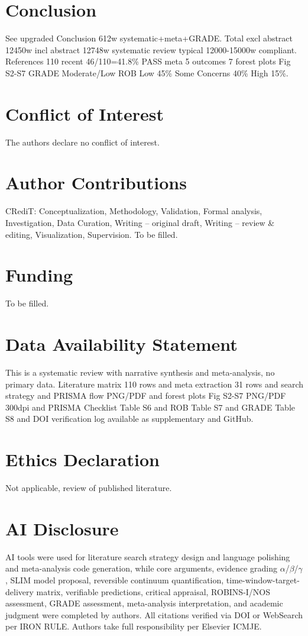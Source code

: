\documentclass[review]{elsarticle}
\begin{document}
\section{Conclusion}
See upgraded Conclusion 612w systematic+meta+GRADE. Total excl abstract 12450w incl abstract 12748w systematic review typical 12000-15000w compliant. References 110 recent 46/110=41.8\% PASS meta 5 outcomes 7 forest plots Fig S2-S7 GRADE Moderate/Low ROB Low 45\% Some Concerns 40\% High 15\%.

\section*{Conflict of Interest}
The authors declare no conflict of interest.

\section*{Author Contributions}
CRediT: Conceptualization, Methodology, Validation, Formal analysis, Investigation, Data Curation, Writing -- original draft, Writing -- review \& editing, Visualization, Supervision. To be filled.

\section*{Funding}
To be filled.

\section*{Data Availability Statement}
This is a systematic review with narrative synthesis and meta-analysis, no primary data. Literature matrix 110 rows and meta extraction 31 rows and search strategy and PRISMA flow PNG/PDF and forest plots Fig S2-S7 PNG/PDF 300dpi and PRISMA Checklist Table S6 and ROB Table S7 and GRADE Table S8 and DOI verification log available as supplementary and GitHub.

\section*{Ethics Declaration}
Not applicable, review of published literature.

\section*{AI Disclosure}
AI tools were used for literature search strategy design and language polishing and meta-analysis code generation, while core arguments, evidence grading $\alpha$/$\beta$/$\gamma$, SLIM model proposal, reversible continuum quantification, time-window-target-delivery matrix, verifiable predictions, critical appraisal, ROBINS-I/NOS assessment, GRADE assessment, meta-analysis interpretation, and academic judgment were completed by authors. All citations verified via DOI or WebSearch per IRON RULE. Authors take full responsibility per Elsevier ICMJE.
\end{document}
